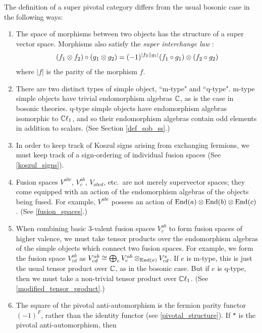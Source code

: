 The definition of a super pivotal category differs from the usual bosonic case in the following ways:

\begin{enumerate}
	\item The space of morphisms between two objects has the structure of 
	a super vector space.
	Morphisms also satisfy the {\em super interchange law} \cite{brundan2016}:
	\begin{align}
	(f_1\otimes f_2) \circ (g_1\otimes g_2) = (-1)^{|f_2| |g_1|} (f_1\circ g_1)\otimes (f_2\circ g_2)
	\end{align}
	where $|f|$ is the parity of the morphism $f$. 
	\item There are two distinct types of simple object, ``m-type" and ``q-type".
	m-type simple objects have trivial endomorphism algebras $\mathbb{C}$, as is the case in bosonic theories.  
	q-type simple objects have endomorphism algebras isomorphic to $\mathbb{C}\ell_1$, 
	and so their endomorphism algebras contain odd elements in addition to scalars. (See Section \ref{def_sob_ss}.)
	\item In order to keep track of Koszul signs arising from exchanging fermions, 
	we must keep track of a sign-ordering of individual fusion spaces (See \ref{koszul_signs}).
	\item Fusion spaces $V^{abc}$, $V^{ab}_c$, $V_{abcd}$, etc.\ are not merely supervector spaces; they come equipped with an action of the
	endomorphism algebras of the objects being fused. 
	For example, $V^{abc}$ possess an action of $\text{End}(a)\otimes \text{End}(b)\otimes \text{End}(c)$.
	(See \ref{fusion_spaces}.)
	\item When combining basic 3-valent fusion spaces $V^{ab}_c$ to form fusion spaces of higher valence, we must take
	tensor products over the endomorphism algebras of the simple objects which connect two fusion spaces. 
	For example, we form the fusion space $V^{ab}_{cd}$ as $V^{ab}_{cd} \cong \bigoplus_e V^{ab}_e \otimes_{\text{End}(e)} V^e_{cd}$.
	If $e$ is m-type, this is just the usual tensor product over $\mathbb{C}$, as in the bosonic case.
	But if $e$ is q-type, then we must take a non-trivial tensor product over $\mathbb{C}\ell_1$.
	(See \ref{modified_tensor_product}.)
	\item The square of the pivotal anti-automorphism is 
	the fermion parity functor $(-1)^F$, rather than the identity functor (see \ref{pivotal_structure}). 
	If $*$ is the pivotal anti-automorphism, then 

\end{enumerate}
